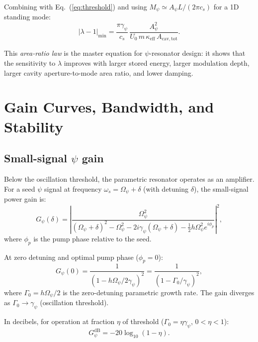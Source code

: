 \documentclass[12pt,aps,prd,twocolumn,superscriptaddress,nofootinbib]{revtex4-2}
\newcommand{\Opsi}{\Omega_\psi}
\newcommand{\gpsi}{\gamma_\psi}
\newcommand{\Mpsi}{M_\psi}
\newcommand{\Apsi}{A_\psi}
\newcommand{\keff}{\kappa_{\mathrm{eff}}}
\newcommand{\Acav}{A_{\mathrm{cav,tot}}}
\newcommand{\lmin}{|\lambda-1|_{\mathrm{min}}}
\begin{document}
Combining with Eq.~(\ref{eq:threshold}) and using
$\Mpsi \simeq \Apsi L/(2\pi c_s)$ for a 1D standing mode:
\begin{equation}
\boxed{
  \lmin = \frac{\pi\gpsi}{c_s}\,
    \frac{\Apsi^2}{U_0\,m\,\keff\,\Acav}.
}
\label{eq:design_law}
\end{equation}

This \emph{area-ratio law} is the master equation for $\psi$-resonator
design: it shows that the sensitivity to $\lambda$ improves with larger
stored energy, larger modulation depth, larger cavity aperture-to-mode
area ratio, and lower damping.


\section{Gain Curves, Bandwidth, and Stability}
\label{sec:gain}

\subsection{Small-signal $\psi$ gain}

Below the oscillation threshold, the parametric resonator operates as an
amplifier.  For a seed $\psi$ signal at frequency $\omega_s = \Opsi +
\delta$ (with detuning $\delta$), the small-signal power gain is:
\begin{equation}
  G_\psi(\delta) = \left|
    \frac{\Opsi^2}
         {(\Opsi + \delta)^2 - \Opsi^2 - 2i\gpsi(\Opsi + \delta)
          - \tfrac{1}{2}h\Opsi^2 e^{i\phi_p}}
  \right|^2,
  \label{eq:gain_curve}
\end{equation}
where $\phi_p$ is the pump phase relative to the seed.

At zero detuning and optimal pump phase ($\phi_p = 0$):
\begin{equation}
  G_\psi(0) = \frac{1}{(1 - h\Opsi/2\gpsi)^2}
  = \frac{1}{(1 - \Gamma_0/\gpsi)^2},
  \label{eq:peak_gain}
\end{equation}
where $\Gamma_0 = h\Opsi/2$ is the zero-detuning parametric growth rate.
The gain diverges as $\Gamma_0 \to \gpsi$ (oscillation threshold).

In decibels, for operation at fraction $\eta$ of threshold
($\Gamma_0 = \eta\gpsi$, $0 < \eta < 1$):
\begin{equation}
  G_\psi^{\mathrm{dB}} = -20\log_{10}(1 - \eta).
  \label{eq:gain_dB}
\end{equation}
\end{document}
